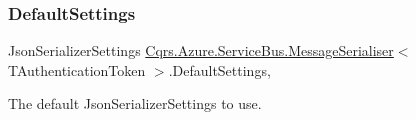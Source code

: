 \subsubsection{\texorpdfstring{Default\+Settings}{DefaultSettings}}
{\footnotesize\ttfamily Json\+Serializer\+Settings \hyperlink{classCqrs_1_1Azure_1_1ServiceBus_1_1MessageSerialiser}{Cqrs.\+Azure.\+Service\+Bus.\+Message\+Serialiser}$<$ T\+Authentication\+Token $>$.Default\+Settings\hspace{0.3cm}{\ttfamily [static]}, {\ttfamily [get]}}



The default Json\+Serializer\+Settings to use. 

